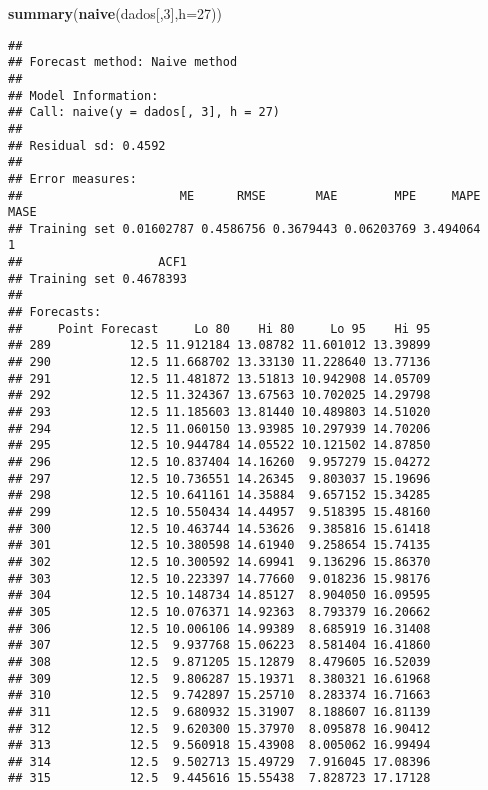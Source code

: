 \documentclass[]{article}
\newenvironment{Shaded}{\begin{snugshade}}{\end{snugshade}}
\newcommand{\DataTypeTok}[1]{\textcolor[rgb]{0.13,0.29,0.53}{#1}}
\newcommand{\DecValTok}[1]{\textcolor[rgb]{0.00,0.00,0.81}{#1}}
\newcommand{\KeywordTok}[1]{\textcolor[rgb]{0.13,0.29,0.53}{\textbf{#1}}}
\newcommand{\NormalTok}[1]{#1}
\begin{document}
\begin{Shaded}
\begin{Highlighting}[]
\KeywordTok{summary}\NormalTok{(}\KeywordTok{naive}\NormalTok{(dados[,}\DecValTok{3}\NormalTok{],}\DataTypeTok{h=}\DecValTok{27}\NormalTok{))}
\end{Highlighting}
\end{Shaded}

\begin{verbatim}
## 
## Forecast method: Naive method
## 
## Model Information:
## Call: naive(y = dados[, 3], h = 27) 
## 
## Residual sd: 0.4592 
## 
## Error measures:
##                      ME      RMSE       MAE        MPE     MAPE MASE
## Training set 0.01602787 0.4586756 0.3679443 0.06203769 3.494064    1
##                   ACF1
## Training set 0.4678393
## 
## Forecasts:
##     Point Forecast     Lo 80    Hi 80     Lo 95    Hi 95
## 289           12.5 11.912184 13.08782 11.601012 13.39899
## 290           12.5 11.668702 13.33130 11.228640 13.77136
## 291           12.5 11.481872 13.51813 10.942908 14.05709
## 292           12.5 11.324367 13.67563 10.702025 14.29798
## 293           12.5 11.185603 13.81440 10.489803 14.51020
## 294           12.5 11.060150 13.93985 10.297939 14.70206
## 295           12.5 10.944784 14.05522 10.121502 14.87850
## 296           12.5 10.837404 14.16260  9.957279 15.04272
## 297           12.5 10.736551 14.26345  9.803037 15.19696
## 298           12.5 10.641161 14.35884  9.657152 15.34285
## 299           12.5 10.550434 14.44957  9.518395 15.48160
## 300           12.5 10.463744 14.53626  9.385816 15.61418
## 301           12.5 10.380598 14.61940  9.258654 15.74135
## 302           12.5 10.300592 14.69941  9.136296 15.86370
## 303           12.5 10.223397 14.77660  9.018236 15.98176
## 304           12.5 10.148734 14.85127  8.904050 16.09595
## 305           12.5 10.076371 14.92363  8.793379 16.20662
## 306           12.5 10.006106 14.99389  8.685919 16.31408
## 307           12.5  9.937768 15.06223  8.581404 16.41860
## 308           12.5  9.871205 15.12879  8.479605 16.52039
## 309           12.5  9.806287 15.19371  8.380321 16.61968
## 310           12.5  9.742897 15.25710  8.283374 16.71663
## 311           12.5  9.680932 15.31907  8.188607 16.81139
## 312           12.5  9.620300 15.37970  8.095878 16.90412
## 313           12.5  9.560918 15.43908  8.005062 16.99494
## 314           12.5  9.502713 15.49729  7.916045 17.08396
## 315           12.5  9.445616 15.55438  7.828723 17.17128
\end{verbatim}
\end{document}
